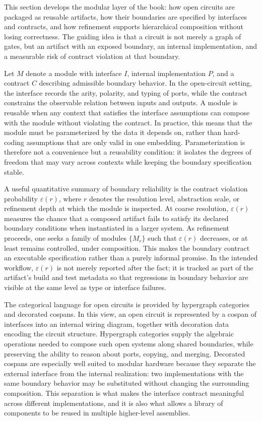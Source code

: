 \documentclass[11pt]{article}
\begin{document}

This section develops the modular layer of the book: how open circuits are packaged as reusable artifacts, how their boundaries are specified by interfaces and contracts, and how refinement supports hierarchical composition without losing correctness. The guiding idea is that a circuit is not merely a graph of gates, but an artifact with an exposed boundary, an internal implementation, and a measurable risk of contract violation at that boundary.

Let \(M\) denote a module with interface \(I\), internal implementation \(P\), and a contract \(C\) describing admissible boundary behavior. In the open-circuit setting, the interface records the arity, polarity, and typing of ports, while the contract constrains the observable relation between inputs and outputs. A module is reusable when any context that satisfies the interface assumptions can compose with the module without violating the contract. In practice, this means that the module must be parameterized by the data it depends on, rather than hard-coding assumptions that are only valid in one embedding. Parameterization is therefore not a convenience but a reusability condition: it isolates the degrees of freedom that may vary across contexts while keeping the boundary specification stable.

A useful quantitative summary of boundary reliability is the contract violation probability \(\varepsilon(r)\), where \(r\) denotes the resolution level, abstraction scale, or refinement depth at which the module is inspected. At coarse resolution, \(\varepsilon(r)\) measures the chance that a composed artifact fails to satisfy its declared boundary conditions when instantiated in a larger system. As refinement proceeds, one seeks a family of modules \(\{M_r\}\) such that \(\varepsilon(r)\) decreases, or at least remains controlled, under composition. This makes the boundary contract an executable specification rather than a purely informal promise. In the intended workflow, \(\varepsilon(r)\) is not merely reported after the fact; it is tracked as part of the artifact's build and test metadata so that regressions in boundary behavior are visible at the same level as type or interface failures.

The categorical language for open circuits is provided by hypergraph categories and decorated cospans. In this view, an open circuit is represented by a cospan of interfaces into an internal wiring diagram, together with decoration data encoding the circuit structure. Hypergraph categories supply the algebraic operations needed to compose such open systems along shared boundaries, while preserving the ability to reason about ports, copying, and merging. Decorated cospans are especially well suited to modular hardware because they separate the external interface from the internal realization: two implementations with the same boundary behavior may be substituted without changing the surrounding composition. This separation is what makes the interface contract meaningful across different implementations, and it is also what allows a library of components to be reused in multiple higher-level assemblies.
\end{document}
